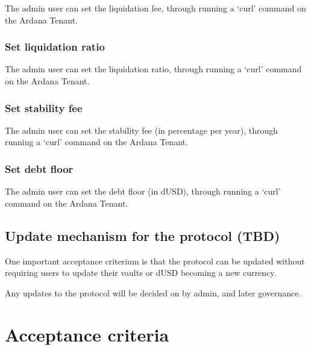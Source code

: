 \documentclass{article} %
\begin{document}
The admin user can set the liquidation fee, through running a `curl' command on
the Ardana Tenant.

\subsubsection{Set liquidation ratio}

The admin user can set the liquidation ratio, through running a `curl' command
on the Ardana Tenant.


\subsubsection{Set stability fee}

The admin user can set the stability fee (in percentage per year), through
running a `curl' command on the Ardana Tenant.

\subsubsection{Set debt floor}

The admin user can set the debt floor (in dUSD), through running a `curl'
command on the Ardana Tenant.

\subsection{Update mechanism for the protocol (TBD)}

One important acceptance criterium is that the protocol can be updated without
requiring users to update their vaults or dUSD becoming a new currency.

Any updates to the protocol will be decided on by admin, and later governance.

\section{Acceptance criteria}
\end{document}
